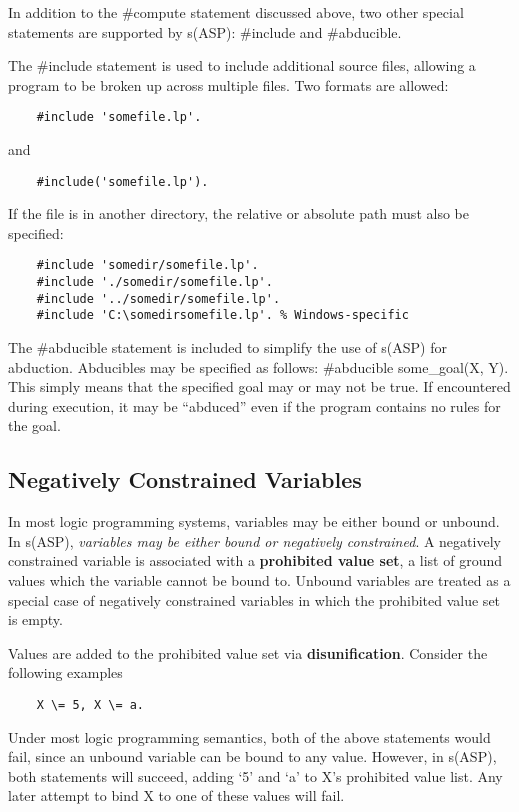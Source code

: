\documentclass[]{article}
\begin{document}
In addition to the \#compute statement discussed above, two other special
statements are supported by s(ASP): \#include and \#abducible.

The \#include statement is used to include additional source files, allowing a
program to be broken up across multiple files. Two formats are allowed:
\begin{verbatim}
    #include 'somefile.lp'.
\end{verbatim}
and
\begin{verbatim}
    #include('somefile.lp').
\end{verbatim}
If the file is in another directory, the relative or absolute path must also
be specified:
\begin{verbatim}
    #include 'somedir/somefile.lp'.
    #include './somedir/somefile.lp'.
    #include '../somedir/somefile.lp'.
    #include 'C:\somedirsomefile.lp'. % Windows-specific
\end{verbatim}
The \#abducible statement is included to simplify the use of s(ASP) for
abduction. Abducibles may be specified as follows:
    \#abducible some\_goal(X, Y).
This simply means that the specified goal may or may not be true. If encountered
during execution, it may be ``abduced'' even if the program contains no rules for
the goal.


\subsection{Negatively Constrained Variables}

In most logic programming systems, variables may be either bound or unbound. In
s(ASP), \textit{variables may be either bound or negatively constrained}. A negatively
constrained variable is associated with a \textbf{prohibited value set}, a list of ground
values which the variable cannot be bound to. Unbound variables are treated as a
special case of negatively constrained variables in which the prohibited value
set is empty.

Values are added to the prohibited value set via \textbf{disunification}. Consider the
following examples
\begin{verbatim}
    X \= 5, X \= a.
\end{verbatim}
Under most logic programming semantics, both of the above statements would fail,
since an unbound variable can be bound to any value. However, in s(ASP), both
statements will succeed, adding `5' and `a' to X's prohibited value list. Any
later attempt to bind X to one of these values will fail.
\end{document}
